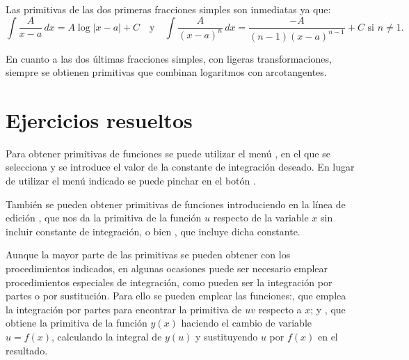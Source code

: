 Las primitivas de las dos primeras fracciones simples son inmediatas
ya que:
\[
\int \frac{A}{x-a}\,dx=A\log|x-a|+C
\quad \textrm{y} \quad
\int \frac{A}{(x-a)^n}\,dx=\frac{-A}{(n-1)(x-a)^{n-1}}+C \textrm{ si $n\neq 1$}.
\]

En cuanto a las dos últimas fracciones simples, con ligeras
transformaciones, siempre se obtienen primitivas que combinan
logaritmos con arcotangentes.

\newpage

\section{Ejercicios resueltos}

\begin{indication}
{Para obtener primitivas de funciones se puede utilizar el menú
, en el que se selecciona
 y se introduce el valor de la constante de
integración deseado. En lugar de utilizar el menú indicado se puede
pinchar en el botón .

También se pueden obtener primitivas de funciones introduciendo en
la línea de edición , que nos da la primitiva de
la función $u$ respecto de la variable $x$ sin incluir constante de
integración, o bien , que incluye dicha
constante.

Aunque la mayor parte de las primitivas se pueden obtener con los
procedimientos indicados, en algunas ocasiones puede ser necesario
emplear procedimientos especiales de integración, como pueden ser la
integración por partes o por sustitución. Para ello se pueden
emplear las funciones:, que emplea la
integración por partes para encontrar la primitiva de $uv$ respecto
a $x$; y , que obtiene la primitiva de la
función $y(x)$ haciendo el cambio de variable $u=f(x)$, calculando
la integral de $y(u)$ y sustituyendo $u$ por $f(x)$ en el resultado.

}
\end{indication}

